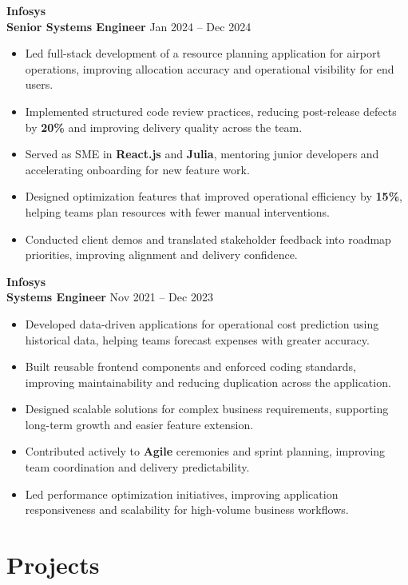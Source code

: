 \documentclass[10pt,a4paper]{article}
\begin{document}
\textbf{Infosys} \\
\textbf{Senior Systems Engineer} \hfill Jan 2024 -- Dec 2024

\begin{itemize}[leftmargin=*]
\item Led full-stack development of a resource planning application for airport operations, improving allocation accuracy and operational visibility for end users.
\item Implemented structured code review practices, reducing post-release defects by \textbf{20\%} and improving delivery quality across the team.
\item Served as SME in \textbf{React.js} and \textbf{Julia}, mentoring junior developers and accelerating onboarding for new feature work.
\item Designed optimization features that improved operational efficiency by \textbf{15\%}, helping teams plan resources with fewer manual interventions.
\item Conducted client demos and translated stakeholder feedback into roadmap priorities, improving alignment and delivery confidence.
\end{itemize}

\textbf{Infosys} \\
\textbf{Systems Engineer} \hfill Nov 2021 -- Dec 2023

\begin{itemize}[leftmargin=*]
\item Developed data-driven applications for operational cost prediction using historical data, helping teams forecast expenses with greater accuracy.
\item Built reusable frontend components and enforced coding standards, improving maintainability and reducing duplication across the application.
\item Designed scalable solutions for complex business requirements, supporting long-term growth and easier feature extension.
\item Contributed actively to \textbf{Agile} ceremonies and sprint planning, improving team coordination and delivery predictability.
\item Led performance optimization initiatives, improving application responsiveness and scalability for high-volume business workflows.
\end{itemize}

\section*{Projects}
\end{document}
